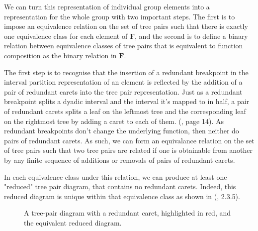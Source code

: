 \documentclass[
11pt, %
english, %
singlespacing, %
parskip, %
headsepline, %
]{amsart} %
\theoremstyle{definition}
\newcommand{\TF}{\textbf{F}}
\newcommand{\drawcaret}[2]{\draw (#1,#2) -- (#1-0.5,#2-1); \draw (#1,#2) -- (#1+0.5,#2-1)}
\begin{document}
We can turn this representation of individual group elements into a representation for the whole group with two important steps. The first is to impose an equivalence relation on the set of tree pairs such that there is exactly one equivalence class for each element of $\TF$, and the second is to define a binary relation between equivalence classes of tree pairs that is equivalent to function composition as the binary relation in $\TF$.

The first step is to recognise that the insertion of a redundant breakpoint in the interval partition representation of an element is reflected by the addition of a pair of redundant carets into the tree pair representation. Just as a redundant breakpoint splits a dyadic interval and the interval it's mapped to in half, a pair of redundant carets splits a leaf on the leftmost tree and the corresponding leaf on the rightmost tree by adding a caret to each of them. (\cite{Fbook}, page 14). As redundant breakpoints don't change the underlying function, then neither do pairs of redundant carets. As such, we can form an equivalance relation on the set of tree pairs such that two tree pairs are related if one is obtainable from another by any finite sequence of additions or removals of pairs of redundant carets. 

In each equivalence class under this relation, we can produce at least one "reduced" tree pair diagram, that contains no redundant carets. Indeed, this reduced diagram is unique within that equivalence class as shown in (\cite{Fbook}, 2.3.5).

\begin{center}
\begin{figure}[H]
\centering
{}
\caption{A tree-pair diagram with a redundant caret, highlighted in red, and the equivalent reduced diagram.}
\end{figure}
\end{center}
\end{document}
